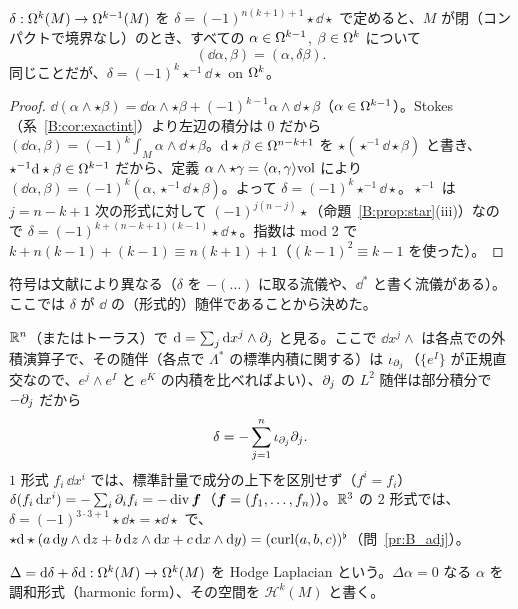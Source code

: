 \begin{prop}[$\dd$ の随伴]\label{B:prop:delta}\tP
$\delta:\Omega^k(M)\to\Omega^{k-1}(M)$ を $\delta=(-1)^{n(k+1)+1}\star\dd\star$ で定めると、$M$ が閉（コンパクトで境界なし）のとき、すべての $\alpha\in\Omega^{k-1}$, $\beta\in\Omega^k$ について
\[
(\dd\alpha,\beta)=(\alpha,\delta\beta).
\]
同じことだが、$\delta=(-1)^k\star^{-1}\dd\star$ on $\Omega^k$。
\end{prop}
\begin{proof}
$\dd(\alpha\wedge\star\beta)=\dd\alpha\wedge\star\beta+(-1)^{k-1}\alpha\wedge\dd\star\beta$（$\alpha\in\Omega^{k-1}$）。Stokes（系~\ref{B:cor:exactint}）より左辺の積分は $0$ だから $(\dd\alpha,\beta)=(-1)^k\int_M\alpha\wedge\dd\star\beta$。$\mathrm{d}\star\beta\in\Omega^{n-k+1}$ を $\star(\star^{-1}\dd\star\beta)$ と書き、$\star^{-1}\mathrm{d}\star\beta\in\Omega^{k-1}$ だから、定義 $\alpha\wedge\star\gamma=\langle\alpha,\gamma\rangle\mathrm{vol}$ により $(\dd\alpha,\beta)=(-1)^k(\alpha,\star^{-1}\dd\star\beta)$。よって $\delta=(-1)^k\star^{-1}\dd\star$。$\star^{-1}$ は $j=n-k+1$ 次の形式に対して $(-1)^{j(n-j)}\star$（命題~\ref{B:prop:star}(iii)）なので $\delta=(-1)^{k+(n-k+1)(k-1)}\star\dd\star$。指数は mod 2 で $k+n(k-1)+(k-1)\equiv n(k+1)+1$（$(k-1)^2\equiv k-1$ を使った）。
\end{proof}
符号は文献により異なる（$\delta$ を $-(\ldots)$ に取る流儀や、$\dd^*$ と書く流儀がある）。ここでは $\delta$ が $\dd$ の（形式的）随伴であることから決めた。

\begin{ex}\label{B:ex:deltaR}
$\mathbb R^n$（またはトーラス）で $\mathrm{d}=\sum_j\mathrm{d} x^j\wedge\partial_j$ と見る。ここで $\dd x^j\wedge$ は各点での外積演算子で、その随伴（各点で $\Lambda^*$ の標準内積に関する）は $\iota_{\partial_j}$（$\{e^I\}$ が正規直交なので、$e^j\wedge e^I$ と $e^K$ の内積を比べればよい）、$\partial_j$ の $L^2$ 随伴は部分積分で $-\partial_j$ だから
\begin{equation}\label{B:eq:deltaflat}
\delta=-\sum_{j=1}^n\iota_{\partial_j}\partial_j .
\end{equation}
$1$ 形式 $f_i\,\dd x^i$ では、標準計量で成分の上下を区別せず（$f^i=f_i$）$\delta(f_i\,\mathrm{d} x^i)=-\sum_i\partial_if_i=-\operatorname{div}\boldsymbol f$（$\boldsymbol f=(f_1,\dots,f_n)$）。$\mathbb R^3$ の $2$ 形式では、$\delta=(-1)^{3\cdot3+1}\star\dd\star=\star\dd\star$ で、$\star\mathrm{d}\star(a\,\mathrm{d} y\wedge\mathrm{d} z+b\,\mathrm{d} z\wedge\mathrm{d} x+c\,\mathrm{d} x\wedge\mathrm{d} y)=(\operatorname{curl}(a,b,c))^\flat$（問~\ref{pr:B_adj}）。
\end{ex}

\begin{defn}\label{B:def:Hodge}
$\Delta=\mathrm{d}\delta+\delta\mathrm{d}:\Omega^k(M)\to\Omega^k(M)$ を Hodge Laplacian という。$\Delta\alpha=0$ なる $\alpha$ を調和形式（harmonic form）、その空間を $\mathcal H^k(M)$ と書く。
\end{defn}


